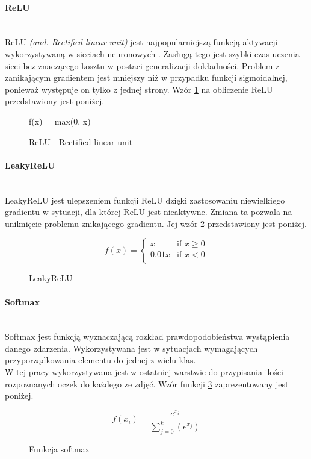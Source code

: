 \paragraph{ReLU} \mbox{}\\
ReLU \textit{(and. Rectified linear unit)} jest najpopularniejszą funkcją
aktywacji wykorzystywaną w sieciach neuronowych \cite{CS231n_activ, WIKIrectifier}.
Zasługą tego jest szybki czas uczenia sieci bez znaczącego kosztu w postaci generalizacji
dokładności. Problem z zanikającym gradientem jest mniejszy niż w przypadku funkcji
sigmoidalnej, ponieważ występuje on tylko z jednej strony.
Wzór \ref{eq:relu} na obliczenie ReLU przedstawiony jest poniżej.
\begin{figure}[h!]
\renewcommand{\figurename}{Wzór}%
\begin{equation**}
f(x) = max(0, x)
\end{equation**}
\caption{ReLU - Rectified linear unit}
\label{eq:relu}
\end{figure}

\paragraph{LeakyReLU} \mbox{}\\
LeakyReLU jest ulepszeniem funkcji ReLU \cite{CS231n_activ} dzięki zastosowaniu niewielkiego
gradientu w sytuacji, dla której ReLU jest nieaktywne. Zmiana ta pozwala na uniknięcie
problemu znikającego gradientu. Jej wzór \ref{eq:leakyrelu} przedstawiony jest poniżej.
\begin{figure}[h!]
\renewcommand{\figurename}{Wzór}%
\begin{equation*}
f(x) =
\begin{cases}
x & \text{if } x \geqslant 0 \\
0.01x & \text{if } x < 0 \\
\end{cases}
\end{equation*}
\caption{LeakyReLU}
\label{eq:leakyrelu}
\end{figure}

\paragraph{Softmax} \mbox{}\\
Softmax jest funkcją wyznaczającą rozkład prawdopodobieństwa wystąpienia danego zdarzenia.
Wykorzystywana jest w sytuacjach wymagających przyporządkowania
elementu do jednej z wielu klas. \\W tej pracy wykorzystywana jest w ostatniej warstwie do
przypisania ilości rozpoznanych oczek do każdego ze zdjęć. Wzór funkcji \ref{eq:softmax} zaprezentowany jest poniżej.
\begin{figure}[h!]
\renewcommand{\figurename}{Wzór}%
\begin{equation*}
f(x_{i}) = \frac{e^{x_{i}}} {\sum_{j = 0}^{k}(e^{x_{j}})}
\end{equation*}
\caption{Funkcja softmax}
\label{eq:softmax}
\end{figure}

